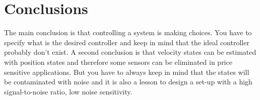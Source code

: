 \section{Conclusions}
The main conclusion is that controlling a system is making choices. You have to specify what is the desired controller and keep in mind that the ideal controller probably don't exist. A second conclusion is that velocity states can be estimated with position states and therefore some sensors can be eliminated in price sensitive applications. But you have to always keep in mind that the states will be contaminated with noise and it is also a lesson to design a set-up with a high signal-to-noise ratio, low noise sensitivity.      